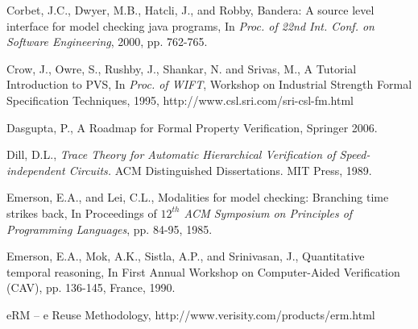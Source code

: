 {\begin{thebibliography}{99}
 Corbet, J.C., Dwyer, M.B., Hatcli, J., and Robby, 
	Bandera: A source level interface for model checking java 
	programs, In {\em Proc. of 22nd Int. Conf. on Software Engineering}, 
	2000, pp. 762-765.

 Crow, J., Owre, S., Rushby, J., Shankar, N. and Srivas, 
	M., A Tutorial Introduction to PVS, In {\em Proc. of WIFT}, Workshop 
	on Industrial Strength Formal Specification Techniques, 1995, 
	http://www.csl.sri.com/sri-csl-fm.html


 Dasgupta, P., A Roadmap for Formal Property Verification, 
		Springer 2006.



 Dill, D.L., {\em Trace Theory for Automatic Hierarchical
        Verification of Speed-independent Circuits.} ACM Distinguished
        Dissertations. MIT Press, 1989.

 Emerson, E.A., and Lei, C.L., Modalities for model
        checking: Branching time strikes back, In
        Proceedings of {\em $12^{th}$ ACM Symposium on Principles of
        Programming Languages}, pp. 84-95, 1985.

  Emerson, E.A., Mok, A.K., Sistla, A.P., and
        Srinivasan, J., Quantitative temporal reasoning, In First Annual
        Workshop on Computer-Aided Verification (CAV), pp. 136-145,
        France, 1990. 

 eRM -- e Reuse Methodology,
	http://www.verisity.com/products/erm.html


\end{thebibliography}}
